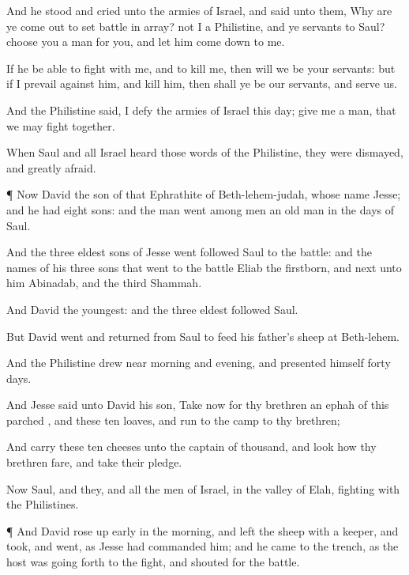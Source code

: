{And he
stood and
cried unto the
armies of
Israel, and
said unto them, Why are ye come
out to set
{}
battle in
array?
{} not I a
Philistine, and ye
servants to
Saul?
choose you a
man for you, and let him come
down to me.

If he be
able to
fight with me, and to
kill me, then will we be your
servants: but if I
prevail against him, and
kill him, then shall ye be our
servants, and
serve us.

And the
Philistine
said, I
defy the
armies of
Israel this
day;
give me a
man, that we may
fight
together.

When
Saul and all
Israel
heard those
words of the
Philistine, they were
dismayed, and
greatly
afraid.


\par }{\PP {}¶ Now
David
{} the
son of that
Ephrathite of
Beth-lehem-judah, whose
name
{}
Jesse; and he had
eight
sons: and the
man
went among
men
{} an old
man in the
days of
Saul.

And the
three
eldest
sons of
Jesse
went
{}
followed
Saul to the
battle: and the
names of his
three
sons that
went to the
battle
{}
Eliab the
firstborn, and
next unto him
Abinadab, and the
third
Shammah.

And
David
{} the
youngest: and the
three
eldest
followed
Saul.

But
David
went and
returned from
Saul to
feed his
father’s
sheep at
Beth-lehem.

And the
Philistine drew
near
morning and
evening, and
presented himself
forty
days.

And
Jesse
said unto
David his
son,
Take now for thy
brethren an
ephah of
this
parched
{}, and these
ten
loaves, and
run to the
camp to thy
brethren;

And
carry these
ten
cheeses unto the
captain of
{}
thousand, and
look how thy
brethren
fare, and
take their
pledge.

Now
Saul, and they, and all the
men of
Israel,
{} in the
valley of
Elah,
fighting with the
Philistines.


\par }{\PP {}¶ And
David rose up
early in the
morning, and
left the
sheep with a
keeper, and
took, and
went, as
Jesse had
commanded him; and he
came to the
trench, as the
host was going
forth to the
fight, and
shouted for the
battle.

}
